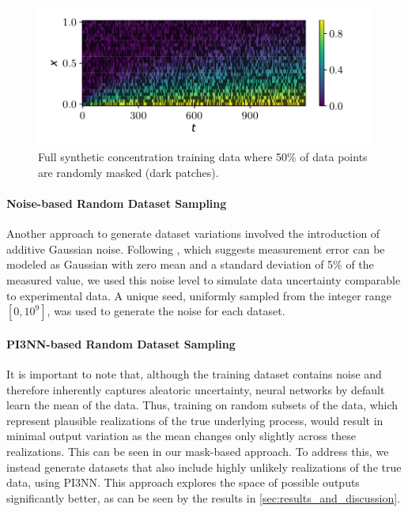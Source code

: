 \begin{figure}[h!]
    \centering
    \includegraphics{figs/c_diss_field_train_random_subset.pdf}
    \caption{Full synthetic concentration training data where 50\% of data points are randomly masked (dark patches).}
    \label{fig:training_data_mask}
\end{figure}


\paragraph{Noise-based Random Dataset Sampling}
\label{sec:da-nnpie_gaussian_noise}
Another approach to generate dataset variations involved the introduction of additive Gaussian noise. Following \citet{nowak2016entropy}, which suggests measurement error can be modeled as Gaussian with zero mean and a standard deviation of 5\% of the measured value, we used this noise level to simulate data uncertainty comparable to experimental data. A unique seed, uniformly sampled from the integer range $[0, 10^9]$, was used to generate the noise for each dataset. %


\paragraph{PI3NN-based Random Dataset Sampling}
\label{sec:random_dataset_sampling}
It is important to note that, although the training dataset contains noise and therefore inherently captures aleatoric uncertainty, neural networks by default learn the mean of the data. Thus, training on random subsets of the data, which represent plausible realizations of the true underlying process, would result in minimal output variation as the mean changes only slightly across these realizations. This can be seen in our mask-based approach. To address this, we instead generate datasets that also include highly unlikely realizations of the true data, using PI3NN. This approach explores the space of possible outputs significantly better, as can be seen by the results in \cref{sec:results_and_discussion}.

